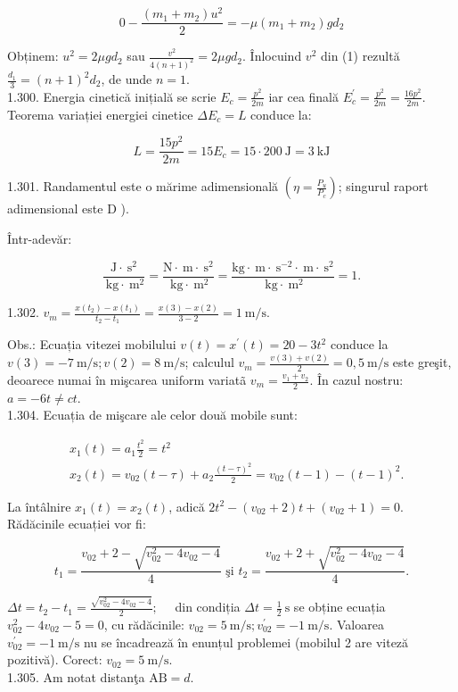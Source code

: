 \documentclass[10pt]{article}
\begin{document}
$$
0-\frac{\left(m_{1}+m_{2}\right) u^{2}}{2}=-\mu\left(m_{1}+m_{2}\right) g d_{2}
$$

Obținem: $u^{2}=2 \mu g d_{2}$ sau $\frac{v^{2}}{4(n+1)^{2}}=2 \mu g d_{2}$. Înlocuind $v^{2}$ din (1) rezultă $\frac{d_{1}}{3}=(n+1)^{2} d_{2}$, de unde $n=1$.\\
1.300. Energia cinetică inițială se scrie $E_{c}=\frac{p^{2}}{2 m}$ iar cea finală $E_{c}^{\prime}=\frac{p^{2}}{2 m}=\frac{16 p^{2}}{2 m}$. Teorema variației energiei cinetice $\Delta E_{c}=L$ conduce la:

$$
L=\frac{15 p^{2}}{2 m}=15 E_{c}=15 \cdot 200 \mathrm{~J}=3 \mathrm{~kJ}
$$

1.301. Randamentul este o mărime adimensională $\left(\eta=\frac{P_{u}}{P_{c}}\right)$; singurul raport adimensional este D ).

Într-adevăr:

$$
\frac{\mathrm{J} \cdot \mathrm{~s}^{2}}{\mathrm{~kg} \cdot \mathrm{~m}^{2}}=\frac{\mathrm{N} \cdot \mathrm{~m} \cdot \mathrm{~s}^{2}}{\mathrm{~kg} \cdot \mathrm{~m}^{2}}=\frac{\mathrm{kg} \cdot \mathrm{~m} \cdot \mathrm{~s}^{-2} \cdot \mathrm{~m} \cdot \mathrm{~s}^{2}}{\mathrm{~kg} \cdot \mathrm{~m}^{2}}=1 .
$$

1.302. $v_{m}=\frac{x\left(t_{2}\right)-x\left(t_{1}\right)}{t_{2}-t_{1}}=\frac{x(3)-x(2)}{3-2}=1 \mathrm{~m} / \mathrm{s}$.

Obs.: Ecuația vitezei mobilului $v(t)=x^{\prime}(t)=20-3 t^{2}$ conduce la $v(3)=-7 \mathrm{~m} / \mathrm{s} ; v(2)=8 \mathrm{~m} / \mathrm{s}$; calculul $v_{m}=\frac{v(3)+v(2)}{2}=0,5 \mathrm{~m} / \mathrm{s}$ este greşit, deoarece numai în mişcarea uniform variatã $v_{m}=\frac{v_{1}+v_{2}}{2}$. În cazul nostru: $a=-6 t \neq c t$.\\
1.304. Ecuația de mişcare ale celor două mobile sunt:

$$
\begin{aligned}
& x_{1}(t)=a_{1} \frac{t^{2}}{2}=t^{2} \\
& x_{2}(t)=v_{02}(t-\tau)+a_{2} \frac{(t-\tau)^{2}}{2}=v_{02}(t-1)-(t-1)^{2} .
\end{aligned}
$$

La întâlnire $x_{1}(t)=x_{2}(t)$, adică $2 t^{2}-\left(v_{02}+2\right) t+\left(v_{02}+1\right)=0$. Rădăcinile ecuației vor fi:

$$
t_{1}=\frac{v_{02}+2-\sqrt{v_{02}^{2}-4 v_{02}-4}}{4} \text { şi } t_{2}=\frac{v_{02}+2+\sqrt{v_{02}^{2}-4 v_{02}-4}}{4} .
$$

$\Delta t=t_{2}-t_{1}=\frac{\sqrt{v_{02}^{2}-4 v_{02}-4}}{2} ; \quad$ din condiția $\Delta t=\frac{1}{2} \mathrm{~s}$ se obține ecuația $v_{02}^{2}-4 v_{02}-5=0$, cu rădăcinile: $v_{02}=5 \mathrm{~m} / \mathrm{s} ; v_{02}^{\prime}=-1 \mathrm{~m} / \mathrm{s}$. Valoarea $v_{02}^{\prime}=-1 \mathrm{~m} / \mathrm{s}$ nu se încadrează în enunțul problemei (mobilul 2 are viteză pozitivă). Corect: $v_{02}=5 \mathrm{~m} / \mathrm{s}$.\\
1.305. Am notat distanţa $\mathrm{AB}=d$.
\end{document}
